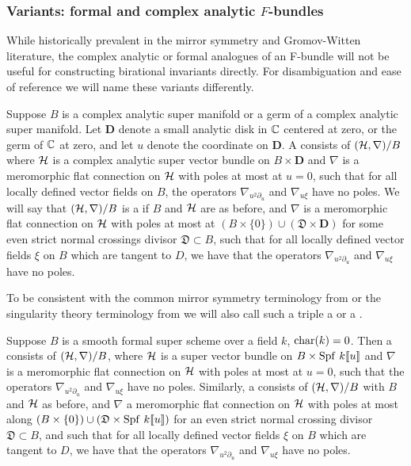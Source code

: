 \documentclass[twoside,leqno]{article}
\numberwithin{equation}{section}
\theoremstyle{plain}
\theoremstyle{definition}
\begin{document}
\subsubsection{Variants: formal and complex analytic \texorpdfstring{$F$}{F}-bundles} \label{sssec:formal.and.Canalytic}

While historically prevalent in the mirror symmetry and Gromov-Witten literature, the complex analytic or formal analogues of an F-bundle will not be useful for constructing birational invariants directly.  For disambiguation and ease of reference we will name these variants differently. 
 
\medskip

Suppose $B$ is a complex analytic  super manifold or a germ of a complex analytic super manifold. Let  $\mathbf{D}$ denote a small analytic disk in $\mathbb C$ centered at zero, or the germ of $\mathbb C$ at zero, and let $u$ denote the coordinate on $\mathbf{D}$. A   consists of $(\mathcal H, \nabla)/B$ where $\mathcal H$ is a complex analytic super vector bundle on $B\times \mathbf{D}$ and $\nabla$ is a meromorphic flat connection on $\mathcal H$ with poles at most at $u=0$, such that for all locally defined vector fields on $B$, the operators $\nabla_{u^2\partial_u}$ and $\nabla_{u\xi}$ have no poles.
 We will say that $(\mathcal H, \nabla)/B$ is a  if $B$ and $\mathcal H$ are as before, and $\nabla$ is a meromorphic flat connection on $\mathcal H$ with poles at most at $(B\times \{0\})\cup(\mathfrak{D}\times \mathbf{D})$ for some even strict normal crossings divisor $\mathfrak{D} \subset B$, such that  for all locally defined vector fields $\xi$ on $B$ which are tangent to $D$, we have that the operators $\nabla_{u^2\partial_u}$ and $\nabla_{u\xi}$ have no poles.
 
 
To be consistent with the common mirror symmetry terminology from \cite{Katzarkov_Hodge_theoretic_aspects} or the singularity theory terminology from \cite{hertling_tt*_geometry} we will also call such a triple a  or  a . 
 
\medskip

Suppose $B$ is a smooth formal super scheme over a field $k$, $\operatorname{char}(k) = 0$. Then a   consists of $(\mathcal H, \nabla)/B$, where $\mathcal H$ is a super vector bundle on $B\times \operatorname{Spf} \, k[\![u]\!]$ and $\nabla$ is a meromorphic flat connection on $\mathcal H$ with poles at most at $u=0$, such that the operators $\nabla_{u^2\partial_u}$ and $\nabla_{u\xi}$ have no poles. Similarly, a 
 consists of $(\mathcal H, \nabla)/B$ with $B$ and $\mathcal H$ as before, and 
$\nabla$ a meromorphic flat connection on $\mathcal H$ with poles at most 
along $(B\times \{0\})\cup (\mathfrak{D}\times \operatorname{Spf} \, k[\![u]\!])$ for an even strict normal crossing divisor $\mathfrak{D} \subset B$, and such that  for all locally defined vector fields $\xi$ on $B$ which are tangent to $D$, we have that the operators $\nabla_{u^2\partial_u}$ and $\nabla_{u\xi}$ have no poles.
\end{document}
